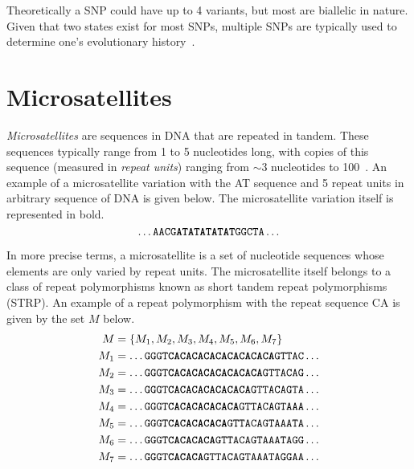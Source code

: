 Theoretically a SNP could have up to 4 variants, but most are biallelic in nature.
Given that two states exist for most SNPs, multiple SNPs are typically used to determine one's evolutionary
history~\cite{jehanSingleNucleotidePolymorphism2006}.

\section{Microsatellites}\label{sec:microsatellites}
\emph{Microsatellites} are sequences in DNA that are repeated in tandem.
These sequences typically range from 1 to 5 nucleotides long, with copies of this sequence (measured in
\emph{repeat units}) ranging from $\sim 3$ nucleotides to
100~\cite{roseThresholdSizeMicrosatellite1998,fanBriefReviewShort2007}.
An example of a microsatellite variation with the AT sequence and 5 repeat units in arbitrary
sequence of DNA is given below.
The microsatellite variation itself is represented in bold.
\begin{equation*}
     \ldots \texttt{AACG\textbf{ATATATATAT}GGCTA} \ldots
\end{equation*}

In more precise terms, a microsatellite is a set of nucleotide sequences whose elements are only varied by repeat units.
The microsatellite itself belongs to a class of repeat polymorphisms known as short tandem repeat polymorphisms (STRP).
An example of a repeat polymorphism with the repeat sequence CA is given by the set $M$ below.
\begin{align*}
    M &= \{ M_1, M_2, M_3, M_4, M_5, M_6, M_7 \} \\
    M_1 &= \ldots \texttt{GGGT\textbf{CACACACACACACACACA}GTTAC} \ldots \\
    M_2 &= \ldots \texttt{GGGT\textbf{CACACACACACACACA}GTTACAG} \ldots \\
    M_3 &= \ldots \texttt{GGGT\textbf{CACACACACACACA}GTTACAGTA} \ldots \\
    M_4 &= \ldots \texttt{GGGT\textbf{CACACACACACA}GTTACAGTAAA} \ldots \\
    M_5 &= \ldots \texttt{GGGT\textbf{CACACACACA}GTTACAGTAAATA} \ldots \\
    M_6 &= \ldots \texttt{GGGT\textbf{CACACACA}GTTACAGTAAATAGG} \ldots \\
    M_7 &= \ldots \texttt{GGGT\textbf{CACACA}GTTACAGTAAATAGGAA} \ldots
\end{align*}


